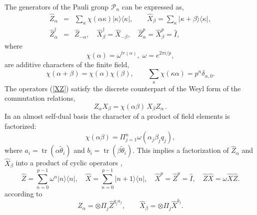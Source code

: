 \documentclass{article}
\DeclareMathOperator{\tr}{tr}
\begin{document}
The generators of the Pauli group $\mathcal{P}_{n}$ can be expressed as, 
\begin{eqnarray}
  \hat{Z}_{\alpha } &=& \sum_{\kappa }\chi \left( \alpha \kappa \right) |\kappa
  \rangle \langle \kappa|,
  \qquad \hat{X}_{\beta }=\sum_{\kappa }|\kappa + \beta \rangle \langle \kappa|,
  \label{XZ} \\
  \hat{Z}_{\alpha }^{\dagger } &=& \hat{Z}_{-\alpha },
  \quad \hat{X}_{\beta }^{\dagger} = \hat{X}_{-\beta },
  \quad \hat{Z}_{\alpha}^{p} = \hat{X}_{\beta}^{p} = \hat{I},
\end{eqnarray}
where
\begin{equation*}
\chi \left( \alpha \right)
  = \omega ^{tr\left( \alpha \right) },\;\omega
  = e^{2\pi i/p},
\end{equation*}
are additive characters of the finite field, 
\begin{equation*}
  \chi \left( \alpha +\beta \right)
  = \chi \left( \alpha \right) \chi \left( \beta \right),
  \qquad \sum_{\kappa }\chi \left( \kappa \alpha \right)
  = p^{n}\delta _{\alpha, 0}.
\end{equation*}
The operators (\ref{XZ}) satisfy the discrete counterpart of the Weyl form
of the commutation relations, 
\begin{equation}
Z_{\alpha }X_{\beta }=\chi \left( \alpha \beta \right) \,X_{\beta }Z_{\alpha
}\,.  \label{commutation_relation}
\end{equation}%
In an almost self-dual basis the character of a product of field elements is
factorized:
\begin{equation}
  \chi \left( \alpha \beta \right)
  = \Pi _{j=1}^{n}\omega \left( \alpha _{j}\beta _{j}q_{j}\right), 
  \label{chi fact}
\end{equation}
where $a_{i} = \tr(\alpha \tilde{\theta}_{i})$ and $b_{i} = \tr(\beta
\tilde{\theta }_{i})$. This implies a factorization of $\hat{Z}_{\alpha}$ and
$\hat{X}_{\beta }$ into a product of cyclic operators
\cite{Schwinger1,Schwinger2}, 
\begin{equation}
  \hat{Z} = \sum_{n=0}^{p-1}\omega ^{n}|n\rangle \langle n|,
  \quad \hat{X} = \sum_{n=0}^{p-1}|n+1\rangle \langle n|,
  \quad \hat{X}^{p} = \hat{Z}^{p} = \hat{I},
  \quad \hat{Z}\hat{X} = \omega \hat{X}\hat{Z}.
\end{equation}
according to 
\begin{equation}
  \hat{Z}_{\alpha } = \otimes \Pi _{j}\hat{Z}^{q_{j}a_{j}},
  \qquad \hat{X}_{\beta} = \otimes \Pi _{j}\hat{X}^{b_{j}}. 
  \label{ZXq}
\end{equation}
\end{document}
